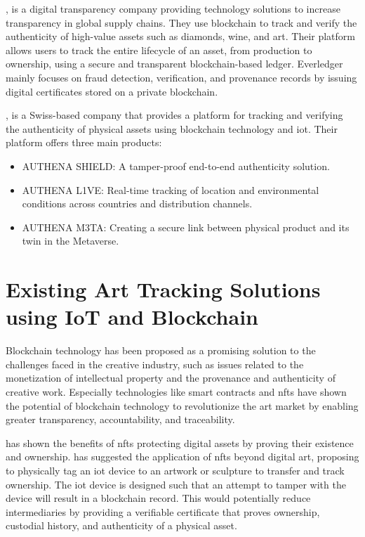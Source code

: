 \textcite{everledger}, is a digital transparency company providing technology solutions to increase transparency in global supply chains. They use blockchain to track and verify the authenticity of high-value assets such as diamonds, wine, and art. Their platform allows users to track the entire lifecycle of an asset, from production to ownership, using a secure and transparent blockchain-based ledger. Everledger mainly focuses on fraud detection, verification, and provenance records by issuing digital certificates stored on a private blockchain.

\textcite{authena}, is a Swiss-based company that provides a platform for tracking and verifying the authenticity of physical assets using blockchain technology and \gls{iot}. Their platform offers three main products:
\begin{itemize}
    \item AUTHENA SHIELD: A tamper-proof end-to-end authenticity solution.
    \item AUTHENA L1VE: Real-time tracking of location and environmental conditions across countries and distribution channels.
    \item AUTHENA M3TA: Creating a secure link between physical product and its twin in the Metaverse.
\end{itemize}

\section{Existing Art Tracking Solutions using IoT and Blockchain}
Blockchain technology has been proposed as a promising solution to the challenges faced in the creative industry, such as issues related to the monetization of intellectual property and the provenance and authenticity of creative work. \cite{creativeindustry} Especially technologies like smart contracts and \glspl{nft} have shown the potential of blockchain technology to revolutionize the art market by enabling greater transparency, accountability, and traceability.  

\textcite{nftopportunities} has shown the benefits of \glspl{nft} protecting digital assets by proving their existence and ownership. \textcite{creativeindustry} has suggested the application of \glspl{nft} beyond digital art, proposing to physically tag an \gls{iot} device to an artwork or sculpture to transfer and track ownership. The \gls{iot} device is designed such that an attempt to tamper with the device will result in a blockchain record. This would potentially reduce intermediaries by providing a verifiable certificate that proves ownership, custodial history, and authenticity of a physical asset.

